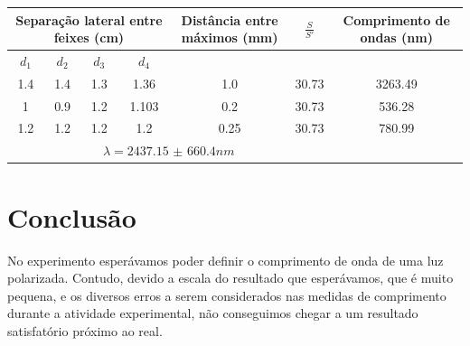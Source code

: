 \documentclass[
12pt,				%
openright,			%
oneside,			%
a4paper,			%
english,			%
french,				%
spanish,			%
brazil,				%
]{abntex2}
\begin{document}
\begin{table}[!htb]
  {%
    \begin{tabular}{ccccccc}
      \toprule
      \multicolumn{4}{c}{Separação lateral entre feixes (cm)} & Distância entre máximos (mm) & $\frac{S}{S'}$ & Comprimento de ondas (nm) \\
      \midrule \midrule
      $d_{1}$ & $d_{2}$ & $d_{3}$& $ d_{4} $ & ~ & ~ &  ~\\
      \hline
      1.4 & 1.4 & 1.3 & 1.36 & 1.0 & 30.73 & 3263.49 \\
      \hline
      1 & 0.9 & 1.2 & 1.103 & 0.2& 30.73 & 536.28 \\
      \hline
      1.2& 1.2& 1.2  & 1.2 & 0.25& 30.73 & 780.99 \\
      \hline
      \multicolumn{6}{c}{$ \lambda = 2437.15$ $\pm$ $660.4 nm $}\\
      
      \bottomrule
    \end{tabular}%
  }
  {%
  }
\end{table}


\clearpage

\chapter{Conclusão}

No experimento esperávamos poder definir o comprimento de onda de uma luz polarizada. Contudo, devido a escala do resultado que esperávamos, que é muito pequena, e os diversos erros a serem considerados nas medidas de comprimento durante a atividade experimental, não conseguimos chegar a um resultado satisfatório próximo ao real.

\clearpage


\end{document}
